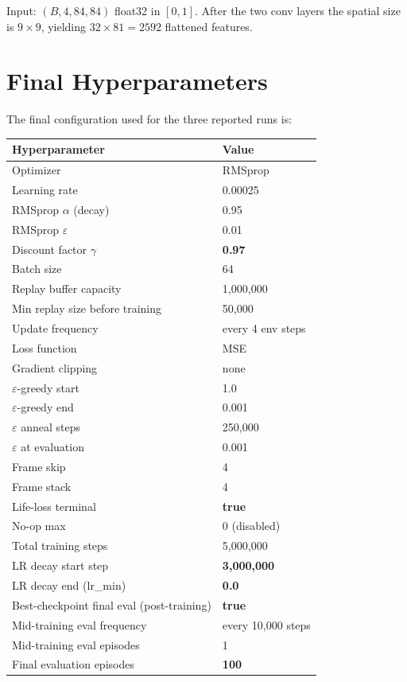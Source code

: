 \documentclass[11pt,a4paper]{article}
\begin{document}
Input: $(B, 4, 84, 84)$ float32 in $[0,1]$. After the two conv layers the spatial size is
$9\times9$, yielding $32 \times 81 = 2592$ flattened features.

\section{Final Hyperparameters}

The final configuration used for the three reported runs is:

\begin{center}
\begin{tabular}{ll}
\toprule
\textbf{Hyperparameter} & \textbf{Value} \\
\midrule
Optimizer & RMSprop \\
Learning rate & 0.00025 \\
RMSprop $\alpha$ (decay) & 0.95 \\
RMSprop $\varepsilon$ & 0.01 \\
Discount factor $\gamma$ & \textbf{0.97} \\
Batch size & 64 \\
Replay buffer capacity & 1{,}000{,}000 \\
Min replay size before training & 50{,}000 \\
Update frequency & every 4 env steps \\
Loss function & MSE \\
Gradient clipping & none \\
\midrule
$\varepsilon$-greedy start & 1.0 \\
$\varepsilon$-greedy end & 0.001 \\
$\varepsilon$ anneal steps & 250{,}000 \\
$\varepsilon$ at evaluation & 0.001 \\
\midrule
Frame skip & 4 \\
Frame stack & 4 \\
Life-loss terminal & \textbf{true} \\
No-op max & 0 (disabled) \\
\midrule
Total training steps & 5{,}000{,}000 \\
LR decay start step & \textbf{3{,}000{,}000} \\
LR decay end (lr\_min) & \textbf{0.0} \\
Best-checkpoint final eval (post-training) & \textbf{true} \\
\midrule
Mid-training eval frequency & every 10{,}000 steps \\
Mid-training eval episodes & 1 \\
Final evaluation episodes & \textbf{100} \\
\bottomrule
\end{tabular}
\end{center}
\end{document}
